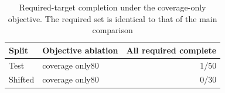 \begin{table}[t]
  \centering
  \caption{Required-target completion under the coverage-only objective. The required set is identical to that of the main comparison}
  \label{tab:required-objective}
  \renewcommand{\arraystretch}{1.08}
  \setlength{\tabcolsep}{5pt}
  \footnotesize
  \begin{tabular}{@{}llr@{}}
    \toprule
    Split & Objective ablation & All required complete \\
    \midrule
    Test & coverage only80 & 1/50 \\
    Shifted & coverage only80 & 0/30 \\
    \bottomrule
  \end{tabular}
\end{table}
